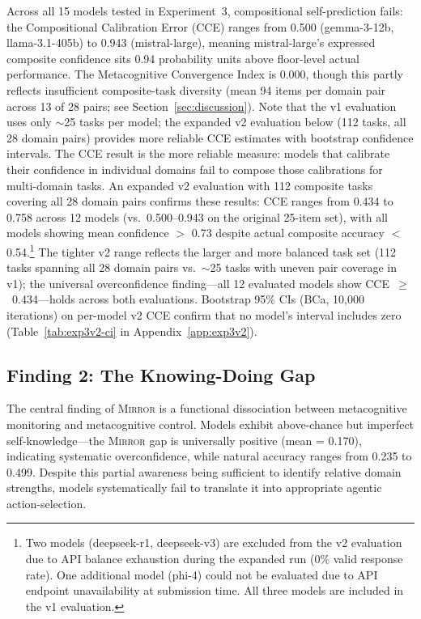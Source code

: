 \documentclass[10pt]{article}
\newcommand{\mirror}{\textsc{Mirror}}
\newcommand{\CCE}{CCE}
\begin{document}
Across all 15 models tested in Experiment~3, compositional self-prediction fails:
the Compositional Calibration Error (\CCE{}) ranges from 0.500 (gemma-3-12b,
llama-3.1-405b) to 0.943 (mistral-large), meaning mistral-large's expressed
composite confidence sits 0.94 probability units above floor-level actual
performance. The Metacognitive Convergence Index is 0.000, though this partly
reflects insufficient composite-task diversity (mean 94 items per domain pair
across 13 of 28 pairs; see Section~\ref{sec:discussion}). Note that the v1 evaluation uses only ${\sim}$25 tasks per model; the expanded v2 evaluation below (112 tasks, all 28 domain pairs) provides more reliable CCE estimates with bootstrap confidence intervals. The \CCE{} result is the more reliable measure: models that calibrate their
confidence in individual domains fail to compose those calibrations for
multi-domain tasks. An expanded v2 evaluation with 112 composite tasks covering all 28 domain pairs
confirms these results: CCE ranges from 0.434 to 0.758 across 12 models (vs.\
0.500--0.943 on the original 25-item set), with all models showing mean
confidence $>$ 0.73 despite actual composite accuracy $<$ 0.54.\footnote{Two models (deepseek-r1, deepseek-v3) are excluded from the v2 evaluation due to API balance exhaustion during the expanded run (0\% valid response rate). One additional model (phi-4) could not be evaluated due to API endpoint unavailability at submission time. All three models are included in the v1 evaluation.}
The tighter v2 range reflects the larger and more balanced task set (112 tasks spanning all 28 domain pairs vs.\ ${\sim}$25 tasks with uneven pair coverage in v1); the universal overconfidence finding---all 12 evaluated models show CCE~$\geq$~0.434---holds across both evaluations.
Bootstrap 95\% CIs (BCa, 10{,}000 iterations) on per-model v2 CCE confirm that no model's interval includes zero (Table~\ref{tab:exp3v2-ci} in Appendix~\ref{app:exp3v2}).

\subsection{Finding 2: The Knowing-Doing Gap}

The central finding of \mirror{} is a functional dissociation between metacognitive
monitoring and metacognitive control. Models exhibit above-chance but imperfect self-knowledge---the \mirror{} gap is
universally positive (mean = 0.170), indicating systematic overconfidence, while
natural accuracy ranges from 0.235 to 0.499. Despite this partial awareness being
sufficient to identify relative domain strengths, models systematically fail to
translate it into appropriate agentic action-selection.
\end{document}

